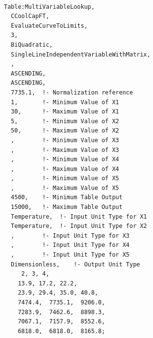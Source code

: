 \begin{lstlisting}

Table:MultiVariableLookup,
  CCoolCapFT,
  EvaluateCurveToLimits,
  3,
  BiQuadratic,
  SingleLineIndependentVariableWithMatrix,
  ,
  ASCENDING,
  ASCENDING,
  7735.1,  !- Normalization reference
  1,       !- Minimum Value of X1
  30,      !- Maximum Value of X1
  5,       !- Minimum Value of X2
  50,      !- Maximum Value of X2
  ,        !- Minimum Value of X3
  ,        !- Maximum Value of X3
  ,        !- Minimum Value of X4
  ,        !- Maximum Value of X4
  ,        !- Minimum Value of X5
  ,        !- Maximum Value of X5
  4500,    !- Minimum Table Output
  15000,   !- Maximum Table Output
  Temperature,  !- Input Unit Type for X1
  Temperature,  !- Input Unit Type for X2
  ,        !- Input Unit Type for X3
  ,        !- Input Unit Type for X4
  ,        !- Input Unit Type for X5
  Dimensionless,    !- Output Unit Type
     2, 3, 4,
    13.9, 17.2, 22.2,
    23.9, 29.4, 35.0, 40.8,
    7474.4,  7735.1,  9206.0,
    7283.9,  7462.6,  8898.3,
    7067.1,  7157.9,  8552.6,
    6818.0,  6818.0,  8165.8;
\end{lstlisting}
